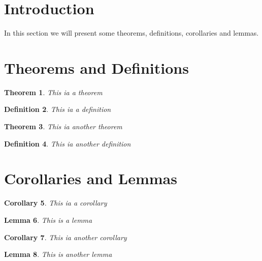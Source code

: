\documentclass{article}
\newtheorem{theorem}{Theorem}[section]
\newtheorem{definition}[theorem]{Definition}
\newtheorem{corollary}[theorem]{Corollary}
\newtheorem{lemma}[theorem]{Lemma}
\begin{document}
	\section{Introduction}
	In this section we will present some theorems, definitions, corollaries and lemmas.
	\section{Theorems and Definitions}
	\begin{theorem}
		This ia a theorem
	\end{theorem}
	\begin{definition}
		This ia a definition
	\end{definition}
	\begin{theorem}
		This ia another theorem
	\end{theorem}
	\begin{definition}
		This ia another definition
	\end{definition}
	\section{Corollaries and Lemmas}
	\begin{corollary}
		This ia a corollary
	\end{corollary}
	\begin{lemma}
		This is a lemma
	\end{lemma}
	\begin{corollary}
		This ia another corollary
	\end{corollary}
	\begin{lemma}
		This is another lemma
	\end{lemma}
\end{document}

